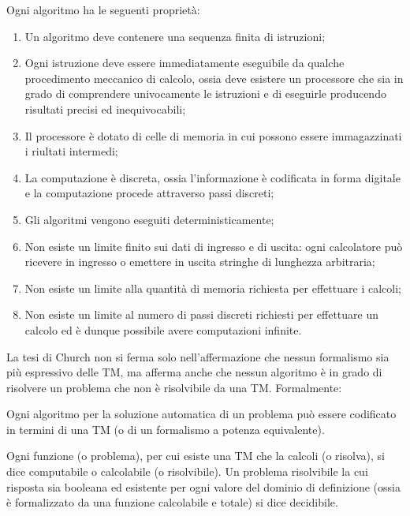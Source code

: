   Ogni algoritmo ha le seguenti proprietà:
  \begin{enumerate}
    \item Un algoritmo deve contenere una sequenza finita di istruzioni;
    \item Ogni istruzione deve essere immediatamente eseguibile da qualche procedimento meccanico di calcolo, ossia deve esistere un processore che sia in grado di comprendere univocamente le istruzioni e di eseguirle producendo risultati precisi ed inequivocabili;
    \item Il processore è dotato di celle di memoria in cui possono essere immagazzinati i riultati intermedi;
    \item La computazione è discreta, ossia l'informazione è codificata in forma digitale e la computazione procede attraverso passi discreti;
    \item Gli algoritmi vengono eseguiti deterministicamente;
    \item Non esiste un limite finito sui dati di ingresso e di uscita: ogni calcolatore può ricevere in ingresso o emettere in uscita stringhe di lunghezza arbitraria;
    \item Non esiste un limite alla quantità di memoria richiesta per effettuare i calcoli;
    \item Non esiste un limite al numero di passi discreti richiesti per effettuare un calcolo ed è dunque possibile avere computazioni infinite.
  \end{enumerate}

  La tesi di Church non si ferma solo nell'affermazione che nessun formalismo sia più espressivo delle TM, ma afferma anche che nessun algoritmo è in grado di risolvere un problema che non è risolvibile da una TM. Formalmente:

  \begin{thesis}
    Ogni algoritmo per la soluzione automatica di un problema può essere codificato in termini di una TM (o di un formalismo a potenza equivalente).
  \end{thesis}

  \begin{theorem}
    Ogni funzione (o problema), per cui esiste una TM che la calcoli (o risolva), si dice computabile o calcolabile (o risolvibile). Un problema risolvibile la cui risposta sia booleana ed esistente per ogni valore del dominio di definizione (ossia è formalizzato da una funzione calcolabile e totale) si dice decidibile.
  \end{theorem}

